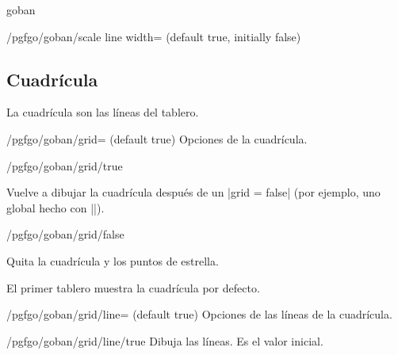 \begin{environment}{{goban}}
\begin{key}{/pgfgo/goban/scale line width= (default true, initially false)}
		\begin{codeexample}[width=5.5cm]
			\begin{goban}[2, scale = 2]
			\end{goban}

			\begin{goban}[2, scale = 2, scale line width]
			\end{goban}
		\end{codeexample}
	\end{key}

	\subsection{Cuadrícula}
	
	La cuadrícula son las líneas del tablero.
	
	\begin{key}{/pgfgo/goban/grid= (default true)}
		Opciones de la cuadrícula.
	\end{key}
	
	\begin{stylekey}{/pgfgo/goban/grid/true}

		Vuelve a dibujar la cuadrícula después de un |grid = false| (por ejemplo, uno global hecho con |\pgfgoset|).
	\end{stylekey}

	\begin{stylekey}{/pgfgo/goban/grid/false}
		
		Quita la cuadrícula y los puntos de estrella.
		
		\begin{codeexample}[]
			\begin{goban}[3]
			\end{goban}
			
			\begin{goban}[3, grid = false]
			\end{goban}
		\end{codeexample}
		
		El primer tablero muestra la cuadrícula por defecto.
	\end{stylekey}
	
	\begin{key}{/pgfgo/goban/grid/line= (default true)}
		Opciones de las líneas de la cuadrícula.
	\end{key}

	\begin{stylekey}{/pgfgo/goban/grid/line/true}
		Dibuja las líneas. Es el valor inicial.
	\end{stylekey}


\end{environment}
